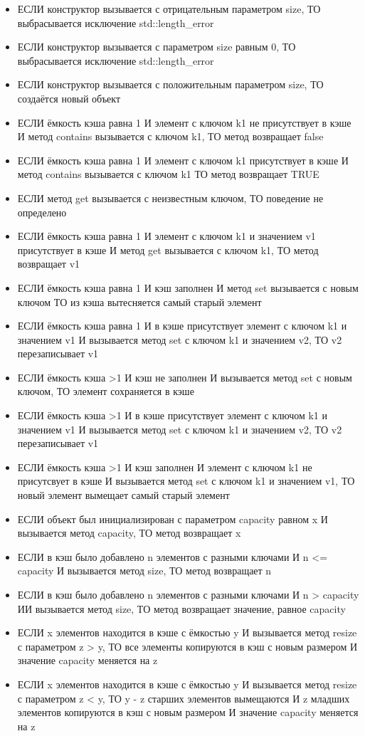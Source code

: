 \begin{itemize}
	\item ЕСЛИ конструктор вызывается с отрицательным параметром size, ТО выбрасывается исключение std::length\_error
	\item ЕСЛИ конструктор вызывается с параметром size равным 0, ТО выбрасывается исключение std::length\_error
	\item ЕСЛИ конструктор вызывается с положительным параметром size, ТО создаётся новый объект
	\item ЕСЛИ ёмкость кэша равна 1 И элемент с ключом k1 не присутствует в кэше И метод contains вызывается с ключом k1, ТО метод возвращает false
	\item ЕСЛИ ёмкость кэша равна 1 И элемент с ключом k1 присутствует в кэше И метод contains вызывается с ключом k1 ТО метод возвращает TRUE
	\item ЕСЛИ метод get вызывается с неизвестным ключом, ТО поведение не определено
	\item ЕСЛИ ёмкость кэша равна 1 И элемент с ключом k1 и значением v1 присутствует в кэше И метод get вызывается с ключом k1, ТО метод возвращает v1
	\item ЕСЛИ ёмкость кэша равна 1 И кэш заполнен И метод set вызывается с новым ключом ТО из кэша вытесняется самый старый элемент
	\item ЕСЛИ ёмкость кэша равна 1 И в кэше присутствует элемент с ключом k1 и значением v1 И вызывается метод set с ключом k1 и значением v2, ТО v2 перезаписывает v1
	\item ЕСЛИ ёмкость кэша >1 И кэш не заполнен И вызывается метод set с новым ключом, ТО элемент сохраняется в кэше
	\item ЕСЛИ ёмкость кэша >1 И в кэше присутствует элемент с ключом k1 и значением v1 И вызывается метод set с ключом k1 и значением v2, ТО v2 перезаписывает v1
	\item ЕСЛИ ёмкость кэша >1 И кэш заполнен И элемент с ключом k1 не присутсвует в кэше И вызывается метод set с ключом k1 и значением v1, ТО новый элемент вымещает самый старый элемент
	\item ЕСЛИ объект был инициализирован с параметром capacity равном x И вызывается метод capacity, ТО метод возвращает x
	\item ЕСЛИ в кэш было добавлено n элементов с разными ключами И n <= capacity И вызывается метод size, ТО метод возвращает n
	\item ЕСЛИ в кэш было добавлено n элементов с разными ключами И n > capacity ИИ вызывается метод size, ТО метод возвращает значение, равное capacity
	\item ЕСЛИ x элементов находится в кэше с ёмкостью y И вызывается метод resize с параметром z > y, ТО все элементы копируются в кэш с новым размером И значение capacity меняется на z
	\item ЕСЛИ x элементов находится в кэше с ёмкостью y И вызывается метод resize с параметром z < y, ТО y - z старших элементов вымещаются И z младших элементов копируются в кэш с новым размером И значение capacity меняется на z
\end{itemize}

